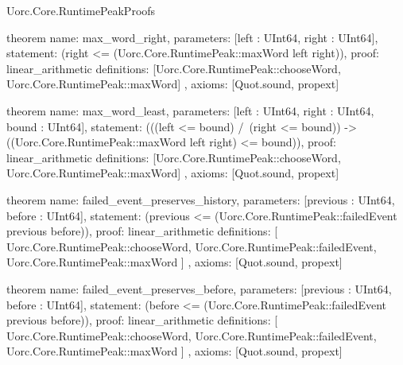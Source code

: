 \begin{lexlean}{Uorc.Core.RuntimePeakProofs}
\begin{semanticmodule}
theorem{
  name: max_word_right,
  parameters: [left : UInt64, right : UInt64],
  statement: (right <= (Uorc.Core.RuntimePeak::maxWord left right)),
  proof: linear_arithmetic{
    definitions: [Uorc.Core.RuntimePeak::chooseWord, Uorc.Core.RuntimePeak::maxWord]
  },
  axioms: [Quot.sound, propext]
}

theorem{
  name: max_word_least,
  parameters: [left : UInt64, right : UInt64, bound : UInt64],
  statement: (((left <= bound) /\ (right <= bound)) -> ((Uorc.Core.RuntimePeak::maxWord left right) <= bound)),
  proof: linear_arithmetic{
    definitions: [Uorc.Core.RuntimePeak::chooseWord, Uorc.Core.RuntimePeak::maxWord]
  },
  axioms: [Quot.sound, propext]
}

theorem{
  name: failed_event_preserves_history,
  parameters: [previous : UInt64, before : UInt64],
  statement: (previous <= (Uorc.Core.RuntimePeak::failedEvent previous before)),
  proof: linear_arithmetic{
    definitions: [
      Uorc.Core.RuntimePeak::chooseWord,
      Uorc.Core.RuntimePeak::failedEvent,
      Uorc.Core.RuntimePeak::maxWord
    ]
  },
  axioms: [Quot.sound, propext]
}

theorem{
  name: failed_event_preserves_before,
  parameters: [previous : UInt64, before : UInt64],
  statement: (before <= (Uorc.Core.RuntimePeak::failedEvent previous before)),
  proof: linear_arithmetic{
    definitions: [
      Uorc.Core.RuntimePeak::chooseWord,
      Uorc.Core.RuntimePeak::failedEvent,
      Uorc.Core.RuntimePeak::maxWord
    ]
  },
  axioms: [Quot.sound, propext]
}
\end{semanticmodule}
\end{lexlean}
